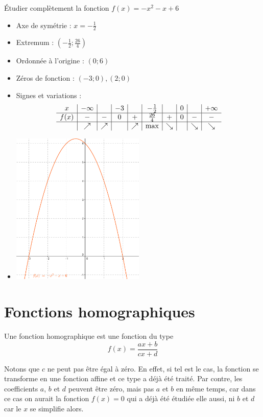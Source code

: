 \begin{exemple}
Étudier complètement la fonction $f(x) = -x^2 -x+6$
			\begin{itemize}
				\item Axe de symétrie : $x=-\frac{1}{2}$
				\item Extremum : $(-\frac{1}{2}; \frac{26}{4})$
				\item Ordonnée à l'origine : $(0;6)$
				\item Zéros de fonction : $(-3;0),(2;0)$
				\item Signes et variations :
				$$
				\begin{array}{c|c|c|c|c|c|c|c|c|c}
				x&-\infty & & -3 & & -\frac{1}{2} & & 0 & & +\infty\\
				\hline
				f(x)& - & - & 0 & + & \frac{26}{4} & + & 0&-&-\\
				\hline
				& \nearrow & \nearrow & &\nearrow &\mbox{max}& \searrow & & \searrow & \searrow
				\end{array}
				$$
				\item
				
				\begin{center}
				\includegraphics[width = 0.5\textwidth]{quadratique/fct_quadratique01.png}
				\end{center}
			\end{itemize}
\end{exemple}

\section{Fonctions homographiques}\label{homographique}

Une fonction homographique est une fonction du type 
$$
f(x) = \frac{ax+b}{cx+d}
$$

Notons que $c$ ne peut pas être égal à zéro. En effet, si tel est le cas, la fonction se transforme en une fonction affine et ce type a déjà été traité. Par contre, les coefficients $a$, $b$ et $d$ peuvent être zéro, mais pas $a$ et $b$ en même temps, car dans ce cas on aurait la fonction $f(x) = 0$ qui a déjà été étudiée elle aussi, ni $b$ et $d$ car le $x$ se simplifie alors.

